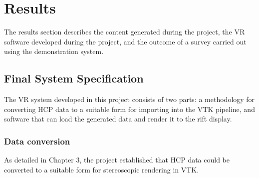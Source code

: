 \documentclass[MSc,paper=a4,pagesize=auto]{icldt}
\begin{document}
\chapter{Results}
The results section describes the content generated during the project, the VR software developed during the project, and the outcome of a survey carried out using the demonstration system.

\clearpage
\section{Final System Specification}
The VR system developed in this project consists of two parts: a methodology for converting HCP data to a suitable form for importing into the VTK pipeline, and software that can load the generated data and render it to the rift display. 

\subsection{Data conversion}
As detailed in Chapter 3, the project established that HCP data could be converted to a suitable form for stereoscopic rendering in VTK. 
\end{document}
